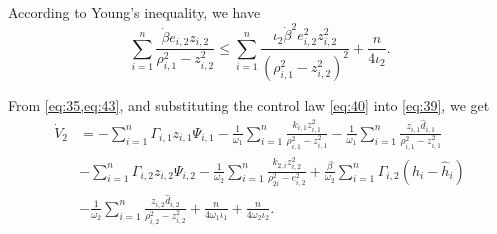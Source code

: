\documentclass[pdflatex,sn-mathphys-num]{sn-jnl}%
\theoremstyle{thmstyleone}%
\theoremstyle{thmstyletwo}%
\theoremstyle{thmstylethree}%
\begin{document}




According to Young's inequality, we have
\begin{equation}\label{eq:43}
		\sum_{i=1}^{n} \frac{\dot{\beta} e_{i,2} z_{i,2}}{\rho_{i,1}^{2} - z_{i,2}^{2}} 
		\leq 
		 \sum_{i=1}^{n} \frac{\iota_2  \dot{\beta}^{2} e_{i,2}^{2} z_{i,2}^{2}}{(\rho_{i,1}^{2} - z_{i,2}^{2})^{2}} 
		+ \frac{n}{4\iota_2 }.
\end{equation}

From \cref{eq:35,eq:43}, and substituting the control law \cref{eq:40} into \cref{eq:39}, we get
\begin{equation}\label{eq:44}
	\begin{aligned}
		\dot{V}_{2}
		& = - \sum_{i=1}^{n}\varGamma_{i,1}z_{i,1}\Psi_{i,1}  - \frac{1}{\omega_{1}}\sum_{i=1}^{n}\frac{k_{i,1} z_{i,1}^2}{\rho_{i,1}^2 - z_{i,1}^2}- \frac{1}{\omega_{1}}\sum_{i=1}^{n} \frac{ z_{i,1}\hat d_{i,1}}{\rho_{i,1}^2 - z_{i,1}^2} \\
		 & - \sum_{i=1}^{n}\varGamma_{i,2}z_{i,2}\Psi_{i,2} - \frac{1}{\omega_{2}}\sum_{i=1}^{n}\frac{ k_{2,i} z_{i,2}^2}{\rho_{2i}^2 - e_{i,2}^2}  + \frac{\beta }{\omega_{2}}\sum_{i=1}^{n} \varGamma_{i,2} (h_{i}-\hat{h}_{i})  \\
		 &- \frac{1}{\omega_{2}}\sum_{i=1}^{n} \frac{ z_{i,2}\hat d_{i,2}}{\rho_{i,2}^2 - z_{i,2}^2}+ \frac{n}{4  \omega_{1} \iota_1 } + \frac{n}{4  \omega_{2}\iota_2 }  .                           
	\end{aligned}
\end{equation}
\end{document}
